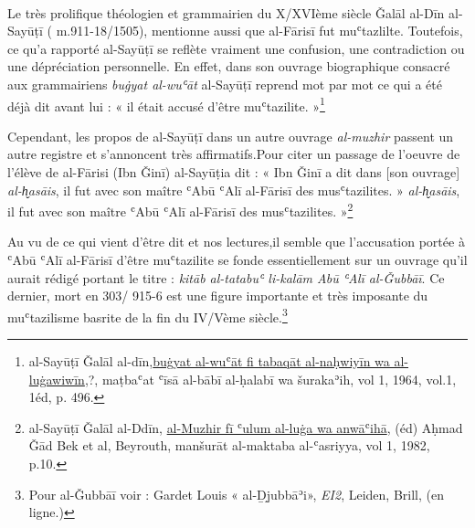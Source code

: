 \documentclass[a4paper,12pt]{report}
\begin{document}
\begin{itemize}
\begin{Arabic}
\end{Arabic}

\paragraph{}
Le très prolifique théologien et grammairien  du X/XVIème siècle Ǧalāl al-Dīn al-Sayūṭī ( m.911-18/1505), mentionne aussi que al-Fārisī fut muʿtazlilte. Toutefois, ce qu’a rapporté  al-Sayūṭī se 
reflète vraiment une confusion,  une contradiction  ou une dépréciation personnelle. En effet, dans son ouvrage biographique consacré aux grammairiens\textit{ buġyat al-wuʿāt} al-Sayūṭī reprend mot par mot ce qui a été déjà dit avant lui : « il était accusé d’être muʿtazilite. »\footnote{al-Sayūṭī Ǧalāl al-dīn,\underline {buġyat al-wuʿāt fi tabaqāt al-naḥwiyīn wa al-luġawiwīn},?, maṭbaʿat ʿīsā al-bābī al-ḥalabī wa šurakaʾih, vol 1, 1964, vol.1, 1éd, p. 496. }
\begin{Arabic}
\end{Arabic}


Cependant, les propos de al-Sayūṭī dans un autre ouvrage\textit{ al-muzhir }passent un autre registre et s’annoncent  très affirmatifs.Pour citer un passage de l'oeuvre de l'élève de   al-Fārisi (Ibn Ǧinī)     al-Sayūṭia dit : 
«  Ibn Ǧinī a dit dans [son ouvrage] \textit{al-h̬asāis}, il fut  avec son maître ʿAbū ʿAlī al-Fārisī des musʿtazilites. »
\textit{al-h̬asāis}, il fut  avec son maître ʿAbū ʿAlī al-Fārisī des musʿtazilites. »\footnote{al-Sayūṭī Ǧalāl al-Ddīn, \underline  {al-Muzhir fī ʿulum al-luġa wa anwāʿihā}, (éd) Aḥmad Ǧād Bek et al, Beyrouth, manšurāt al-maktaba al-ʿasriyya, vol 1, 1982, p.10.  } 
\begin{Arabic}
\end{Arabic}

Au vu de ce qui vient d'être dit et nos lectures,il semble que l’accusation portée à ʿAbū ʿAlī al-Fāris\=i d’être muʿtazilite se fonde essentiellement sur un ouvrage qu'il aurait rédigé portant le titre : \textit{kitāb al-tatabuʿ li-kalām Abū ʿAlī al-Ǧubbāī}. Ce dernier, mort en 303/ 915-6 est une figure importante et très imposante du muʿtazilisme  basrite de la fin du IV/Vème siècle.\footnote{ Pour  al-Ǧubbāī voir :  Gardet Louis « al-Ḏj̲ubbāʾi»,\textit{ EI2}, Leiden, Brill, (en ligne.)

}
\end{itemize}
\end{document}
